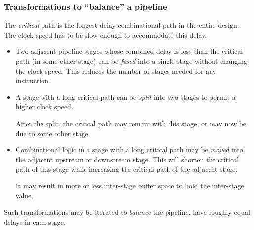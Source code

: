 
\begin{frame}[fragile]
\frametitle{Transformations to ``balance'' a pipeline}

\footnotesize

The \emph{critical} path is the longest-delay combinational path in
the entire design.  The clock speed has to be slow enough to
accommodate this delay.

\vxx

\begin{itemize}

  \item Two adjacent pipeline stages whose combined delay is less than
      the critical path (in some other stage) can be \emph{fused} into
      a single stage without changing the clock speed.  This reduces
      the number of stages needed for any instruction.

  \item A stage with a long critical path can be \emph{split} into two
      stages to permit a higher clock speed.

      After the split, the critical path may remain with this stage,
      or may now be due to some other stage.

  \item Combinational logic in a stage with a long critical path may
      be \emph{moved} into the adjacent upstream or downstream stage.
      This will shorten the critical path of this stage while
      increasing the critical path of the adjacent stage.

      It may result in more or less inter-stage buffer space to hold
      the inter-stage value.

\end{itemize}

\vxx

Such transformations may be iterated to \emph{balance} the pipeline,
{\ie} have roughly equal delays in each stage.

\end{frame}


